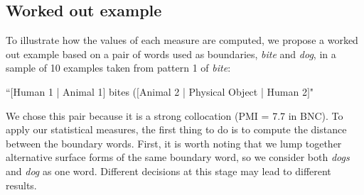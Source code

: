 \documentclass[output=paper]{langsci/langscibook}
\begin{document}
\subsection{Worked out example}

To illustrate how the values of each measure are computed, we propose a
worked out example based on a pair of words used as boundaries, \textit{bite}
and \textit{dog}, in a sample of 10 examples taken from pattern 1 of \textit{bite}: 



``$[$Human 1 | Animal 1$]$ bites ($[$Animal 2 | Physical Object | Human 2$]$"



We chose this pair because it is a strong collocation (PMI = 7.7 in
BNC). To apply our statistical measures, the first thing to do is to
compute the distance between the boundary words. First, it is worth
noting that we lump together alternative surface forms of the same
boundary word, so we consider both \textit{dogs} and \textit{dog} as one word.
Different decisions at this stage may lead to different results.
\end{document}
